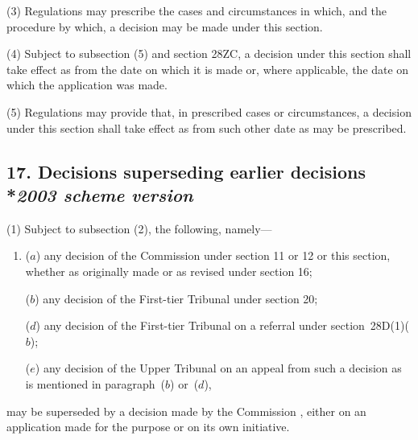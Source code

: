 \documentclass[12pt,a4paper]{article}
\begin{document}
(3) Regulations may prescribe the cases and circumstances in which, and the procedure by which, a decision may be made under this section.

(4) Subject to subsection (5) and section 28ZC, a decision under this section shall take effect as from the date on which it is made or, where applicable, the date on which the application was made.

(5) Regulations may provide that, in prescribed cases or circumstances, a decision under this section shall take effect as from such other date as may be prescribed.


\subsection[17. Decisions superseding earlier decisions --- \emph{2003 scheme version}]{17. Decisions superseding earlier decisions\\*\emph{2003 scheme version}}

(1) Subject to subsection (2), the following, namely—
\begin{enumerate}\item[]
($a$) any decision of the 
Commission  %
under section 11 or 12 or this section, whether as originally made or as revised under section 16;

($b$) any decision of 
the First-tier Tribunal  %
under section 20; 



\begin{sloppypar}
($d$) any decision of 
the First-tier Tribunal  %
on a referral under section~28D(1)($b$);
\end{sloppypar}

($e$) any decision of 
the Upper Tribunal  %
on an appeal from such a decision as is mentioned in paragraph~($b$)  or~($d$),
\end{enumerate}
may be superseded by a decision made by the 
Commission%
, either on an application made for the purpose or on 
its  %
own initiative.
\end{document}
